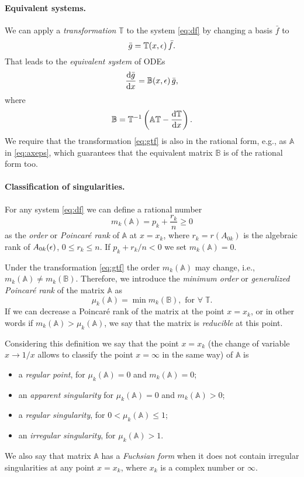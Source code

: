 \documentclass[12pt,a4paper]{article}
\def\M#1{\mathbb{#1}} %
\begin{document}
\paragraph{Equivalent systems.}
We can apply a {\em transformation} $\M T$ to the system \eqref{eq:df} by changing a basis $\bar{f}$ to
\begin{equation}
\label{eq:gtf}
  \bar{g} = \M T(x,\eps)\, \bar{f}.
\end{equation}
That leads to the {\em equivalent system} of ODEs
\begin{equation}
  \frac{\D \bar{g}}{\D x} = \M B(x,\eps)\,\bar{g},
\end{equation}
where
\begin{equation}
\label{eq:bta}
  \M B = \M T^{-1} \left( \M A \M T - \frac{\D \M T}{\D x} \right).
\end{equation}
We require that the transformation \eqref{eq:gtf} is also in the rational form, e.g.,  as $\M A$ in \eqref{eq:axeps}, which guarantees that the equivalent matrix $\M B$ is of the rational form too.

\paragraph{Classification of singularities.}
For any system \eqref{eq:df} we can define a rational number
\begin{equation}
  m_k(\M A) = p_k + \frac{r_k}{n} \ge 0
\end{equation}
as the {\em order} or {\em Poincar\'e rank} of $\M A$ at $x=x_k$, where $r_k = r(A_{0k})$ is the algebraic rank of $A_{0k}(\epsilon)$, $0 \le r_k \le n$.
If $p_k + r_k/n < 0$ we set $m_k(\M A) = 0$.

Under the transformation \eqref{eq:gtf} the order $m_k(\M A)$ may change, i.e., $m_k(\M A) \ne m_k(\M B)$.
Therefore, we introduce the {\em minimum order} or {\em generalized Poincar\'e rank} of the matrix $\M A$ as
\begin{equation}
\label{eq:muk}
  \mu_k(\M A) = \min m_k(\M B), \text{ for } \forall \; \M T.
\end{equation}
If we can decrease a Poincar\'e rank of the matrix at the point $x=x_k$, or in other words if $m_k(\M A) > \mu_k(\M A)$, we say that the matrix is {\em reducible} at this point.

Considering this definition we say that the point $x=x_k$ (the change of variable $x \to 1/x$ allows to classify the point $x=\infty$ in the same way) of $\M A$ is
\begin{itemize}
  \item a {\em regular point}, for $\mu_k(\M A) = 0$ and $m_k(\M A) = 0$;
  \item an {\em apparent singularity} for $\mu_k(\M A) = 0$ and $m_k(\M A) > 0$;
  \item a {\em regular singularity}, for $0 < \mu_k(\M A) \le 1$;
  \item an {\em irregular singularity}, for $\mu_k(\M A) > 1$.
\end{itemize}
We also say that matrix $\M A$ has a {\em Fuchsian form} when it does not contain irregular singularities at any point $x=x_k$, where $x_k$ is a complex number or $\infty$.
\end{document}
